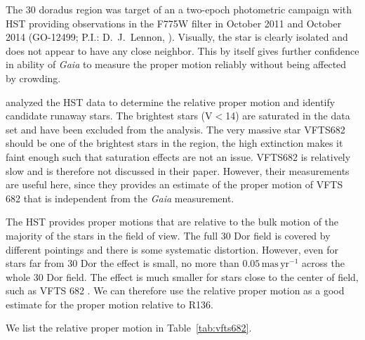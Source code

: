 \documentclass[apjl,twocolumn]{emulateapj}
\newcommand{\SdM}[1]{{{\color{brown}{#1}}}}
\newcommand{\masyr}{\,\mathrm{mas}\,\mathrm{yr}^{-1}}
\DeclareRobustCommand{\Tabref}[1]{Table~\ref{#1}}
\begin{document}

The 30 doradus region was target of an a two-epoch photometric campaign with HST providing observations in the F775W filter in October 2011 and October 2014 (GO-12499; P.I.: D.~J.~Lennon, \citealt{sabbi:13}). Visually, the star is clearly isolated and does not appear to have any close neighbor. This by itself gives further confidence in ability of \emph{Gaia} to measure the proper motion reliably without being affected by crowding. 

 \citet{platais:15, platais:18} analyzed the HST data to determine the relative proper motion and identify candidate runaway stars. The brightest stars (V$<$14) are saturated in the data set and have been excluded from the analysis.  The very massive star VFTS682 should be one of the brightest stars in the region, the high extinction makes it faint enough such that saturation effects are not an issue.   VFTS682 is relatively slow and is therefore not discussed in their paper.  However, their measurements are useful here, since they provides an  estimate of the proper motion of VFTS 682 that is independent from the \emph{Gaia} measurement. 
 
The HST provides proper motions that are relative to the bulk motion of the majority of the stars in the field of view. The full 30 Dor field is covered by different pointings and there is some systematic distortion.  However, even for stars far from 30 Dor the effect is small, no more than $0.05\masyr$ across the whole 30 Dor field. The effect is much smaller for stars close to the center of field, such as VFTS 682 \citet{platais:18}.  We can therefore use the relative proper motion as a good estimate for the proper motion relative to R136. 
 
 We list the relative proper motion in \Tabref{tab:vfts682}. 
 


\end{document}
